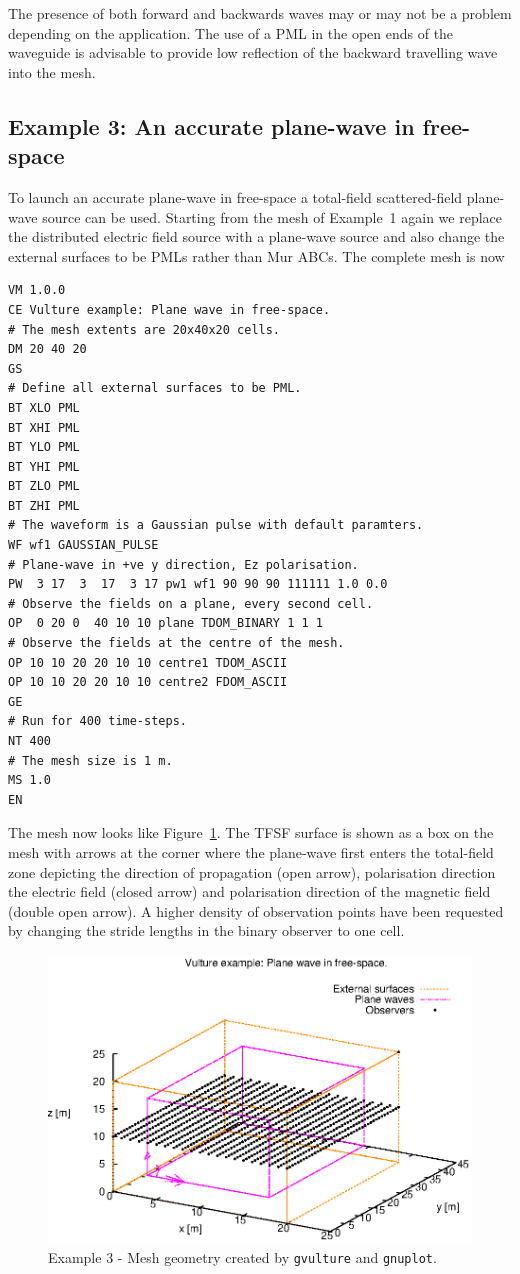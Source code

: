 \documentclass[onecolumn,a4paper]{article}
\numberwithin{equation}{section}
\begin{document}
The presence of both forward and backwards waves may or
may not be a problem depending on the application. The use of a PML in the open ends of
the waveguide is advisable to provide low reflection of the backward travelling wave into the mesh. 

\subsection{Example 3: An accurate plane-wave in free-space}

To launch an accurate plane-wave in free-space a total-field scattered-field plane-wave
source can be used. Starting from the mesh of Example~1 again we replace the distributed
electric field source with a plane-wave source and also change the external surfaces
to be PMLs rather than Mur ABCs. The complete mesh is now
\begin{verbatim}
VM 1.0.0
CE Vulture example: Plane wave in free-space.
# The mesh extents are 20x40x20 cells.
DM 20 40 20
GS
# Define all external surfaces to be PML.
BT XLO PML
BT XHI PML
BT YLO PML
BT YHI PML
BT ZLO PML
BT ZHI PML
# The waveform is a Gaussian pulse with default paramters.
WF wf1 GAUSSIAN_PULSE
# Plane-wave in +ve y direction, Ez polarisation.
PW  3 17  3  17  3 17 pw1 wf1 90 90 90 111111 1.0 0.0
# Observe the fields on a plane, every second cell.
OP  0 20 0  40 10 10 plane TDOM_BINARY 1 1 1
# Observe the fields at the centre of the mesh.
OP 10 10 20 20 10 10 centre1 TDOM_ASCII
OP 10 10 20 20 10 10 centre2 FDOM_ASCII
GE
# Run for 400 time-steps.
NT 400 
# The mesh size is 1 m.
MS 1.0
EN
\end{verbatim}
The mesh now looks like Figure~\ref{fg:planewave_mesh}. The TFSF surface is shown as a box on the mesh
with arrows at the corner where the plane-wave first enters the total-field zone depicting the direction
of propagation (open arrow), polarisation direction the electric field (closed arrow) and polarisation
direction of the magnetic field (double open arrow). A higher density of observation points have been 
requested by changing the stride lengths in the binary observer to one cell.

\begin{figure}[ht]
\centerline{\includegraphics[width=12cm]{figures/planewave_mesh}}
\caption{\label{fg:planewave_mesh} Example 3 - Mesh geometry created by \texttt{gvulture} and \texttt{gnuplot}.}
\end{figure}
\end{document}
